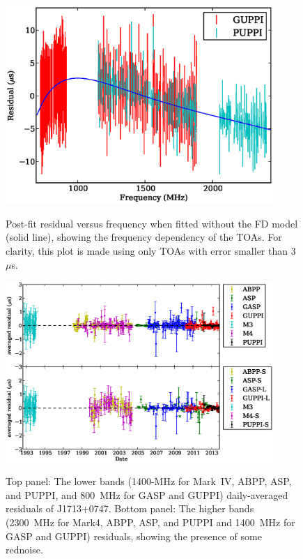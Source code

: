 \documentclass[12pt,preprint]{aastex}
\begin{document}
\begin{figure}
\includegraphics[width=4in]{FD.ps} \\ 
\caption {\label{fig:FD} Post-fit residual versus frequency when fitted
without the FD model (solid line), showing the frequency dependency of the TOAs. For
clarity, this plot is made using only TOAs with error smaller than 3~$\mu$s.} 
\end{figure} 

\begin{figure}
\includegraphics[width=4in]{residual.eps} \\ 
\caption {\label{fig:res} Top panel: The lower bands (1400-MHz for
Mark~IV, ABPP, ASP, and PUPPI, and 800~MHz for GASP and GUPPI) daily-averaged residuals of
J1713+0747. Bottom panel: The higher bands (2300~MHz for Mark4, ABPP, ASP, and PUPPI and
1400~MHz for GASP and GUPPI) residuals, showing the presence of some rednoise.} 
\end{figure} 
\end{document}
